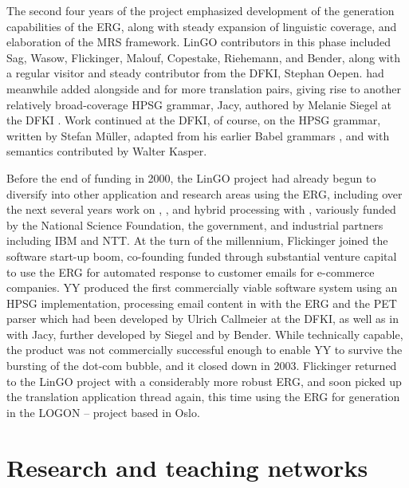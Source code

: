 \documentclass[output=paper
 	        ,biblatex
                ,babelshorthands
                ,newtxmath
                ,draftmode
                ,colorlinks, citecolor=brown
]{langscibook}
\begin{document}
The second four years of the \verbmobil project emphasized development of the generation capabilities of the ERG, along with steady expansion of linguistic coverage, and elaboration of the MRS framework.  LinGO contributors in this phase included Sag, Wasow, Flickinger, Malouf, Copestake, Riehemann, and Bender, along with a regular visitor and steady contributor from the DFKI, Stephan Oepen.  \verbmobil had meanwhile added  alongside  \citep{MK2000a} and  \citep*{FCS2000a} for more translation pairs, giving rise to another relatively broad-coverage HPSG grammar, Jacy, authored by Melanie Siegel at the DFKI \citep{Siegel2000a}.  Work continued at the DFKI, of course, on the  HPSG grammar, written by Stefan Müller, adapted from his earlier Babel grammars \citep{Mueller99a}, and with semantics contributed by Walter Kasper.

Before the end of \verbmobil funding in 2000, the LinGO project had already begun to diversify into other application and research areas using the ERG, including over the next several years work on , , and hybrid processing with , variously funded by the National Science Foundation, the  government, and industrial partners including IBM and NTT.  At the turn of the millennium, Flickinger joined the software start-up boom, co-founding  funded through substantial venture capital to use the ERG for automated response to customer emails for e-commerce companies.  YY produced the first commercially viable software system using an HPSG implementation, processing email content in  with the ERG and the PET parser \citep{callmeier00} which had been developed by Ulrich Callmeier at the DFKI, as well as in  with Jacy, further developed by Siegel and by Bender.  While technically capable, the product was not commercially successful enough to enable YY to survive the bursting of the dot-com bubble, and it closed down in 2003.  Flickinger returned to the LinGO project with a considerably more robust ERG, and soon picked up the translation application thread again, this time using the ERG for generation in the LOGON --  project \citep{Lon:Oep:Ber:04} based in Oslo.


\section{Research and teaching networks}
\end{document}
